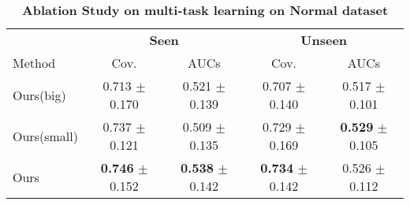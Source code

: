 \begin{table}[htbp]
\centering
\begin{tabular}{lcc|cc}
\toprule
& \multicolumn{2}{c|}{\textbf{Seen}} & \multicolumn{2}{c}{\textbf{Unseen}} \\
\multirow{-2}{*}{Method} & Cov. & AUCs & Cov. & AUCs \\
\midrule
Ours(big) & 0.713 $\pm$ 0.170 & 0.521 $\pm$ 0.139 & 0.707 $\pm$ 0.140 & 0.517 $\pm$ 0.101 \\
Ours(small) & 0.737 $\pm$ 0.121 & 0.509 $\pm$ 0.135 & 0.729 $\pm$ 0.169 & \textbf{0.529} $\pm$ 0.105 \\
Ours & \textbf{0.746} $\pm$ 0.152 & \textbf{0.538} $\pm$ 0.142 & \textbf{0.734} $\pm$ 0.142 & 0.526 $\pm$ 0.112 \\
\bottomrule
\end{tabular}
\caption{\textbf{Ablation Study on multi-task learning on Normal dataset}}
\label{tab:ablation1}
\end{table}